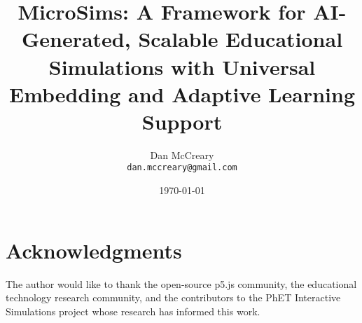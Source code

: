 \documentclass[11pt]{article}
\title{MicroSims: A Framework for AI-Generated, Scalable Educational Simulations with Universal Embedding and Adaptive Learning Support}
\author{
    Dan McCreary \\
    \texttt{dan.mccreary@gmail.com}
}
\date{\today}
\begin{document}
\maketitle














\section*{Acknowledgments}
The author would like to thank the open-source p5.js community, the educational technology research community, and the contributors to the PhET Interactive Simulations project whose research has informed this work.



\end{document}
